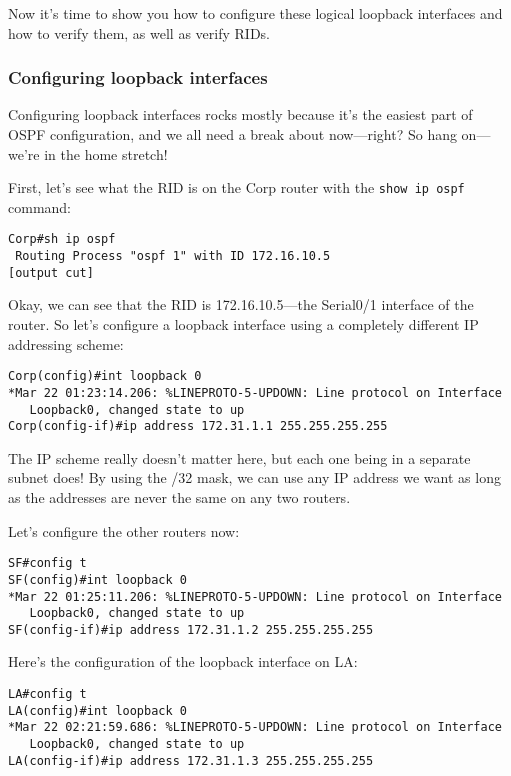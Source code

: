 Now it's time to show you how to configure these logical loopback interfaces and how to verify them, as well as verify RIDs.


\subsubsection{Configuring loopback interfaces}

Configuring loopback interfaces rocks mostly because it's the easiest
part of OSPF configuration, and we all need a break about now---right?
So hang on---we're in the home stretch!

First, let's see what the RID is on the Corp router with the
\texttt{show\ ip\ ospf} command:

\begin{verbatim}
Corp#sh ip ospf
 Routing Process "ospf 1" with ID 172.16.10.5
[output cut]
\end{verbatim}

Okay, we can see that the RID is 172.16.10.5---the Serial0/1 interface
of the router. So let's configure a loopback interface using a
completely different IP addressing scheme:

\begin{verbatim}
Corp(config)#int loopback 0
*Mar 22 01:23:14.206: %LINEPROTO-5-UPDOWN: Line protocol on Interface
   Loopback0, changed state to up
Corp(config-if)#ip address 172.31.1.1 255.255.255.255
\end{verbatim}

The IP scheme really doesn't matter here, but each one being in a
separate subnet does! By using the /32 mask, we can use any IP address
we want as long as the addresses are never the same on any two routers.

Let's configure the other routers now:

\begin{verbatim}
SF#config t
SF(config)#int loopback 0
*Mar 22 01:25:11.206: %LINEPROTO-5-UPDOWN: Line protocol on Interface
   Loopback0, changed state to up
SF(config-if)#ip address 172.31.1.2 255.255.255.255
\end{verbatim}

Here's the configuration of the loopback interface on LA:

\begin{verbatim}
LA#config t
LA(config)#int loopback 0
*Mar 22 02:21:59.686: %LINEPROTO-5-UPDOWN: Line protocol on Interface
   Loopback0, changed state to up
LA(config-if)#ip address 172.31.1.3 255.255.255.255
\end{verbatim}

